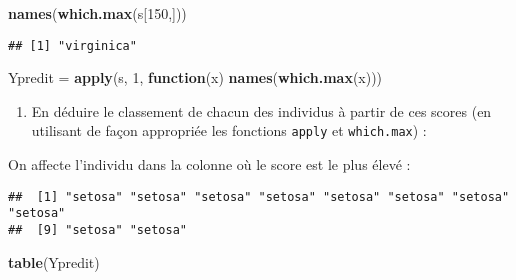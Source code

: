 \documentclass[
]{article}
\newenvironment{Shaded}{\begin{snugshade}}{\end{snugshade}}
\newcommand{\ControlFlowTok}[1]{\textcolor[rgb]{0.13,0.29,0.53}{\textbf{#1}}}
\newcommand{\DecValTok}[1]{\textcolor[rgb]{0.00,0.00,0.81}{#1}}
\newcommand{\KeywordTok}[1]{\textcolor[rgb]{0.13,0.29,0.53}{\textbf{#1}}}
\newcommand{\NormalTok}[1]{#1}
\newcommand{\OperatorTok}[1]{\textcolor[rgb]{0.81,0.36,0.00}{\textbf{#1}}}
\newcommand{\StringTok}[1]{\textcolor[rgb]{0.31,0.60,0.02}{#1}}
\providecommand{\tightlist}{%
  \setlength{\itemsep}{0pt}\setlength{\parskip}{0pt}}
\begin{document}
\begin{Shaded}
\begin{Highlighting}[]
\KeywordTok{names}\NormalTok{(}\KeywordTok{which.max}\NormalTok{(s[}\DecValTok{150}\NormalTok{,]))}
\end{Highlighting}
\end{Shaded}

\begin{verbatim}
## [1] "virginica"
\end{verbatim}

\begin{Shaded}
\begin{Highlighting}[]
\NormalTok{Ypredit =}\StringTok{ }\KeywordTok{apply}\NormalTok{(s, }\DecValTok{1}\NormalTok{, }\ControlFlowTok{function}\NormalTok{(x) }\KeywordTok{names}\NormalTok{(}\KeywordTok{which.max}\NormalTok{(x)))}
\end{Highlighting}
\end{Shaded}

\begin{enumerate}
\def\labelenumi{\arabic{enumi}.}
\setcounter{enumi}{23}
\tightlist
\item
  En déduire le classement de chacun des individus à partir de ces
  scores (en utilisant de façon appropriée les fonctions \texttt{apply}
  et \texttt{which.max}) :
\end{enumerate}

On affecte l'individu dans la colonne où le score est le plus élevé :

\begin{Shaded}
\end{Shaded}

\begin{verbatim}
##  [1] "setosa" "setosa" "setosa" "setosa" "setosa" "setosa" "setosa" "setosa"
##  [9] "setosa" "setosa"
\end{verbatim}

\begin{Shaded}
\begin{Highlighting}[]
\KeywordTok{table}\NormalTok{(Ypredit)}
\end{Highlighting}
\end{Shaded}
\end{document}
